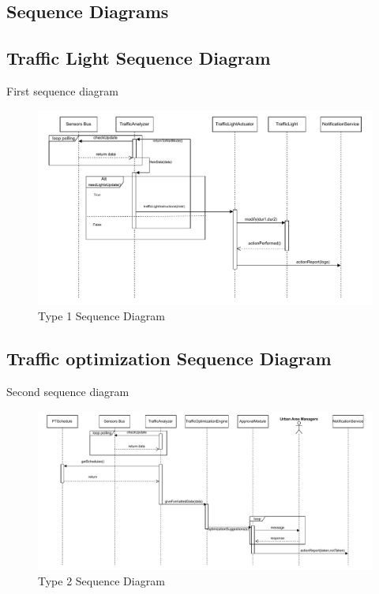 \documentclass[a4paper,12pt]{article}
\begin{document}
\newpage

\subsection{Sequence Diagrams}
\subsection*{Traffic Light Sequence Diagram}
First sequence diagram
\begin{figure}[h]
    \centering
    \includegraphics[width=1.1\textwidth]{diagrams/SequenceDiagram1.pdf}
    \caption{Type 1 Sequence Diagram}
    \label{fig:SeqDiag1.drawio}
\end{figure}

\newpage
\subsection*{Traffic optimization Sequence Diagram}
Second sequence diagram
\begin{figure}[h]
    \centering
    \includegraphics[width=1.1\textwidth]{diagrams/SequenceDiagram2.pdf}
    \caption{Type 2 Sequence Diagram}
    \label{fig:SeqDiag2.drawio}
\end{figure}
\end{document}

